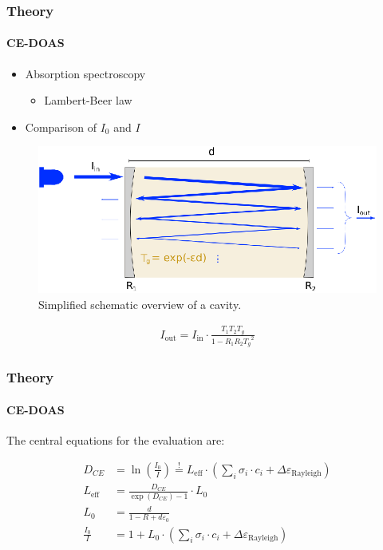 \documentclass[english]{beamer}
\begin{document}
\begin{frame}
  \frametitle{Theory}
  \framesubtitle{CE-DOAS}
  \begin{itemize}
  \item Absorption spectroscopy
    \begin{itemize}
    \item Lambert-Beer law
    \end{itemize}

  \item Comparison of \(I_0\) and \(I\)
  \end{itemize}
  \begin{figure}[htbp]
    \centering
    \includegraphics[scale=.5]{images/reflection.eps}
    \caption{Simplified schematic overview of a cavity.}
    \label{fig:cavity}
  \end{figure}
  \begin{align*}
    I_{\text{out}} = I_{\text{in}} \cdot \frac{T_1 T_2 T_g}{1 - R_1 R_2 {T_g}^2}
  \end{align*}
\end{frame}


\begin{frame}
  \frametitle{Theory}
  \framesubtitle{CE-DOAS}
  
  The central equations for the evaluation are:

  \begin{align*}
    D_{CE} & = \ln\left(\frac{I_0}{I}\right) \stackrel{!}{=}
             L_{\text{eff}} \cdot \left (\sum_i \sigma_i \cdot c_i
             + \Delta \varepsilon_{\text{Rayleigh}} \right)\\
    L_{\text{eff}} &  = \frac{D_{CE}}{\exp(D_{CE}) - 1} \cdot L_0 \\
    L_0 & = \frac{d}{1 - R + d\varepsilon_0}\\
    \frac{I_0}{I} & = 1 +  L_0 \cdot \left (\sum_i \sigma_i \cdot c_i
             + \Delta \varepsilon_{\text{Rayleigh}} \right)
  \end{align*}
\end{frame}
\end{document}
